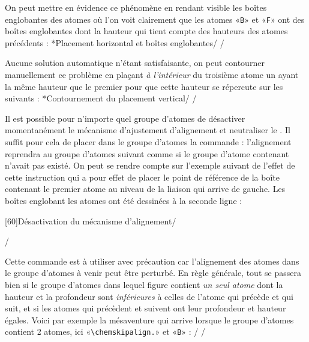 \documentclass[10pt]{article}
\makeatletter
\newcommand\idx{\@ifstar{\let\print@or@not\@gobble\idx@}{\let\print@or@not\@firstofone\idx@}}
\newcommand\idx@[1]{%
	\ifcat\expandafter\noexpand\@car#1\@nil\relax%
		\expandafter\ifx\@car#1\@nil\protect
			\index{#1}%
			\print@or@not{#1}%
		\else
			\saveexpandmode\expandarg
			\StrSubstitute{\string#1}{\string @}{\@empty\protect\symbol{'100}}[\temp@]%
			\StrGobbleLeft\temp@1[\temp@]%
			\restoreexpandmode
			\expandafter\index\expandafter{\temp@ @\protect\texttt{\protect\textbackslash\temp@}}%
			\print@or@not{\texttt{\string#1}}%
		\fi
	\else
		\index{#1}%
		\print@or@not{#1}%
	\fi
}
\newcommand\make@car@active[1]{%
	\catcode`#1\active
	\begingroup
		\lccode`\~`#1\relax
		\lowercase{\endgroup\def~}%
}
\newif\if@exstar
\newcommand\exemple{%
	\begingroup
	\parskip\z@
	\@makeother\;\@makeother\!\@makeother\?\@makeother\:%
	\@ifstar{\@exstartrue\exemple@}{\@exstarfalse\exemple@}}
\newcommand\exemple@[2][65]{%
	\medbreak\noindent
	\begingroup
		\let\do\@makeother\dospecials
		\make@car@active\ { {}}%
		\make@car@active\^^M{\par\leavevmode}%
		\make@car@active\^^I{\space\space}%
		\make@car@active\,{\leavevmode\kern\z@\string,}%
		\make@car@active\-{\leavevmode\kern\z@\string-}%
		\make@car@active\>{\leavevmode\kern\z@\string>}%
		\make@car@active\<{\leavevmode\kern\z@\string<}%
		\exemple@@{#1}{#2}%
}
\newcommand\exemple@@[3]{%
	\def\@tempa##1#3{\exemple@@@{#1}{#2}{##1}}%
	\@tempa
}
\newcommand\exemple@@@[3]{%
	\xdef\the@code{#3}%
	\endgroup
	\if@exstar
		\begingroup
			\fboxrule0.4pt
			\let\breakboxparindent\z@
			\def\bkvz@bottom{\hrule\@height\fboxrule}%
			\let\bkvz@before@breakbox\relax
			\def\bkvz@set@linewidth{\advance\linewidth\dimexpr-2\fboxrule-2\fboxsep}%
			\def\bkvz@left{\vrule\@width\fboxrule\hskip\fboxsep}%
			\def\bkvz@right{\hskip\fboxsep\vrule\@width\fboxrule}%
			\def\bkvz@top{\hbox to \hsize{%
				\vrule\@width\fboxrule\@height\fboxrule
				\leaders\bkvz@bottom\hfill
				\ECFAugie
				\fboxsep\z@
				\colorbox{black}{\kern0.25em\color{white}\footnotesize\lower0.5ex\hbox{\strut#2}\kern0.25em}%
				\leaders\bkvz@bottom\hfill
				\vrule\@width\fboxrule\@height\fboxrule}}%
			\breakbox
				\kern.5ex\relax
				\ttfamily\footnotesize\the@code\par
				\normalfont
				\kern3pt
				\hrule height0.1pt width\linewidth depth0.1pt
				\vskip5pt
				\rightskip0pt plus 1fill
				\everypar{{\color{lightgray}\rlap{\vrule height0.1pt width\linewidth depth0.1pt}}\hskip0pt plus 1fill}%
				\newlinechar`\^^M\everyeof{\noexpand}\scantokens{#3}\par
			\endbreakbox
		\endgroup
	\else
		\vskip0.5ex
		\boxput*(0,1)
			{\fboxsep\z@
			\hbox{\ECFAugie\colorbox{black}{\leavevmode\kern0.25em{\color{white}\footnotesize\strut#2}\kern0.25em}}%
			}%
			{\fboxsep5pt
			\fbox{%
				$\vcenter{\hsize\dimexpr0.#1\linewidth-\fboxsep-\fboxrule\relax
					\kern5pt\parskip0pt \ttfamily\footnotesize\the@code}%
				\vcenter{\kern5pt\hsize\dimexpr\linewidth-0.#1\linewidth-\fboxsep-\fboxrule\relax
					\everypar{{\color{lightgray}\rlap{\vrule height0.1pt width\dimexpr\linewidth-0.#1\linewidth-\fboxsep-\fboxrule depth0.1pt}}}%
					\footnotesize\newlinechar`\^^M\everyeof{\noexpand}\scantokens{#3}}$%
				}%
			}%
	\fi
	\medbreak
	\endgroup
}
\let\do\@makeother\dospecials
\makeatother
\begin{document}
On peut mettre en évidence ce phénomène en rendant visible les boîtes englobantes des atomes où l'on voit clairement que les atomes «\verb-B-» et «\verb-F-» ont des boîtes englobantes dont la hauteur qui tient compte des hauteurs des atomes précédents :
\exemple*{Placement horizontal et boîtes englobantes}/\Huge\setatomsep{2em}
\fboxsep=0pt
\renewcommand\printatom[1]{\fbox{\ensuremath{\mathrm#1}}}
\qquad
{}/

Aucune solution automatique n'étant satisfaisante, on peut contourner manuellement ce problème en plaçant \emph{à l'intérieur} du troisième atome un \idx{\vphantom} ayant la même hauteur que le premier pour que cette hauteur se répercute sur les suivants :
\exemple*{Contournement du placement vertical}/\Huge\setatomsep{2em}
\qquad
{}/

\label{chemskipalign}Il est possible pour n'importe quel groupe d'atomes de désactiver momentanément le mécanisme d'ajustement d'alignement et neutraliser le \idx\vphantom. Il suffit pour cela de placer dans le groupe d'atomes la commande \idx{\chemskipalign} : l'alignement reprendra au groupe d'atomes suivant comme si le groupe d'atome contenant \idx{\chemskipalign} n'avait pas existé. On peut se rendre compte sur l'exemple suivant de l'effet de cette instruction qui a pour effet de placer le point de référence de la boîte contenant le premier atome au niveau de la liaison qui arrive de gauche. Les boîtes englobant les atomes ont été dessinées à la seconde ligne :

\exemple[60]{Désactivation du mécanisme d'alignement}/\large
{}\quad
{}\par\bigskip
\fboxsep=0pt
\renewcommand\printatom[1]{\fbox{\ensuremath{\mathrm{#1}}}}
\quad
{}/

Cette commande est à utiliser avec précaution car l'alignement des atomes dans le groupe d'atomes à venir peut être perturbé. En règle générale, tout se passera bien si le groupe d'atomes dans lequel figure \idx{\chemskipalign} contient \emph{un seul atome} dont la hauteur et la profondeur sont \emph{inférieures} à celles de l'atome qui précède et qui suit, et si les atomes qui précèdent et suivent ont leur profondeur et hauteur égales. Voici par exemple la mésaventure qui arrive lorsque le groupe d'atomes contient 2 atomes, ici «\verb-\chemskipalign.-» et «\verb-B-» :
\exemple{Conséquence de la commande \string\chemskipalign}/\large
\fboxsep=0pt
\renewcommand\printatom[1]{\fbox{\ensuremath{\mathrm{#1}}}}
/
\end{document}
